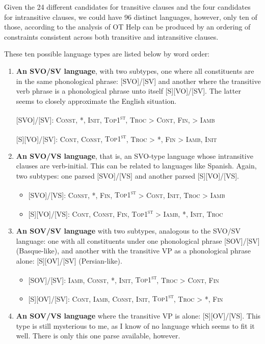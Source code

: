 \documentclass{article}
\newcommand{\cont}{\textsc{Cont}}
\newcommand{\iamb}{\textsc{Iamb}}
\newcommand{\cons}{\textsc{Const}}
\newcommand{\topf}{\textsc{Top1\textsuperscript{st}}}
\newcommand{\nophi}{\textsc{*\textphi}}
\newcommand{\finphi}{\textsc{Fin\textphi}}
\newcommand{\initphi}{\textsc{Init\textphi}}
\newcommand{\troc}{\textsc{Troc}}
\begin{document}
Given the 24 different candidates for transitive clauses and the four candidates for intransitive clauses, we could have 96 distinct languages, however, only ten of those, according to the analysis of OT Help can be produced by an ordering of constraints consistent across both transitive and intransitive clauses.

These ten possible language types are listed below by word order:

\begin{enumerate}
\item \textbf{An SVO/SV language}, with two subtypes, one where all constituents are in the same phonological phrase: [SVO]/[SV] and another where the transitive verb phrase is a phonological phrase unto itself [S][VO]/[SV].
	The latter seems to closely approximate the English situation.

[SVO]/[SV]: \cons, \nophi, \initphi, \topf, {\troc} {\textgreater} \cont, {\finphi,} {\textgreater} \iamb

[S][VO]/[SV]: \cont, \cons, \topf, {\troc} {\textgreater} \nophi, {\finphi} {\textgreater} \iamb, \initphi
\item \textbf{An SVO/VS language}, that is, an SVO-type language whose intransitive clauses are verb-initial.
	This can be related to languages like Spanish.
		Again, two subtypes: one parsed [SVO]/[VS] and another parsed [S][VO]/[VS].

\begin{itemize}
\item {}[SVO]/[VS]: \cons, \nophi, \finphi, {\topf} {\textgreater} \cont, \initphi, {\troc} {\textgreater} \iamb
\item {}[S][VO]/[VS]: \cont, \cons, \finphi, {\topf} {\textgreater} \iamb, \nophi, \initphi, \troc
\end{itemize}
\item \textbf{An SOV/SV language} with two subtypes, analogous to the SVO/SV language: one with all constituents under one phonological phrase [SOV]/[SV] (Basque-like), and another with the transitive VP as a phonological phrase alone: [S][OV]/[SV] (Persian-like).

\begin{itemize}
\item {}[SOV]/[SV]: \iamb, \cons, \nophi, \initphi, \topf, {\troc} {\textgreater} \cont, \finphi
\item {} [S][OV]/[SV]: \cont, \iamb, \cons, \initphi, \topf, {\troc} {\textgreater} \nophi, \finphi
\end{itemize}
\item \textbf{An SOV/VS language} where the transitive VP is alone: [S][OV]/[VS].
	This type is still mysterious to me, as I know of no language which seems to fit it well. There is only this one parse available, however.


\end{enumerate}
\end{document}
